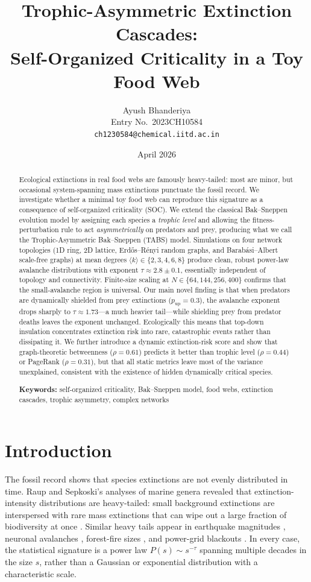 \documentclass[11pt,a4paper]{article}
\title{\textbf{Trophic-Asymmetric Extinction Cascades:\\ Self-Organized Criticality in a Toy Food Web}}
\author[1]{Ayush Bhanderiya \\ \normalsize Entry No.\ 2023CH10584 \\ \normalsize \texttt{ch1230584@chemical.iitd.ac.in}}
\affil[1]{Department of Chemical Engineering, Indian Institute of Technology Delhi}
\date{April 2026}
\begin{document}
\maketitle

\begin{abstract}
\noindent Ecological extinctions in real food webs are famously heavy-tailed: most are minor, but occasional system-spanning mass extinctions punctuate the fossil record. We investigate whether a minimal toy food web can reproduce this signature as a consequence of self-organized criticality (SOC). We extend the classical Bak--Sneppen evolution model by assigning each species a \emph{trophic level} and allowing the fitness-perturbation rule to act \emph{asymmetrically} on predators and prey, producing what we call the Trophic-Asymmetric Bak--Sneppen (TABS) model. Simulations on four network topologies (1D ring, 2D lattice, Erd\H{o}s--R\'enyi random graphs, and Barab\'asi--Albert scale-free graphs) at mean degrees $\langle k \rangle \in \{2,3,4,6,8\}$ produce clean, robust power-law avalanche distributions with exponent $\tau \approx 2.8 \pm 0.1$, essentially independent of topology and connectivity. Finite-size scaling at $N \in \{64,144,256,400\}$ confirms that the small-avalanche region is universal. Our main novel finding is that when predators are dynamically shielded from prey extinctions ($p_{\text{up}} = 0.3$), the avalanche exponent drops sharply to $\tau \approx 1.73$---a much heavier tail---while shielding prey from predator deaths leaves the exponent unchanged. Ecologically this means that top-down insulation concentrates extinction risk into rare, catastrophic events rather than dissipating it. We further introduce a dynamic extinction-risk score and show that graph-theoretic betweenness ($\rho = 0.61$) predicts it better than trophic level ($\rho = 0.44$) or PageRank ($\rho = 0.31$), but that all static metrics leave most of the variance unexplained, consistent with the existence of hidden dynamically critical species.

\vspace{0.5em}
\noindent\textbf{Keywords:} self-organized criticality, Bak--Sneppen model, food webs, extinction cascades, trophic asymmetry, complex networks
\end{abstract}

\section{Introduction}
The fossil record shows that species extinctions are not evenly distributed in time. Raup and Sepkoski's analyses of marine genera revealed that extinction-intensity distributions are heavy-tailed: small background extinctions are interspersed with rare mass extinctions that can wipe out a large fraction of biodiversity at once \citep{raup1982mass,sepkoski1993compendium}. Similar heavy tails appear in earthquake magnitudes \citep{gutenberg1944frequency}, neuronal avalanches \citep{beggs2003neuronal}, forest-fire sizes \citep{malamud1998forest}, and power-grid blackouts \citep{carreras2004blackouts}. In every case, the statistical signature is a power law $P(s) \sim s^{-\tau}$ spanning multiple decades in the size $s$, rather than a Gaussian or exponential distribution with a characteristic scale.
\end{document}
